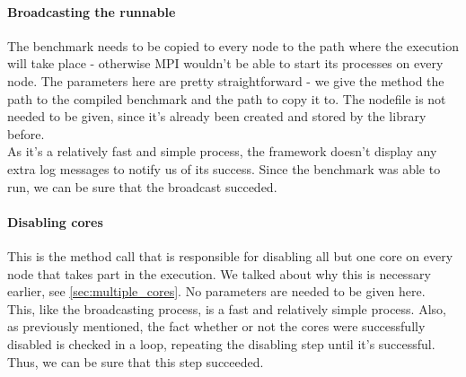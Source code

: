 \paragraph{Broadcasting the runnable}
The benchmark needs to be copied to every node to the path where the
execution will take place - otherwise MPI wouldn't be able to start
its processes on every node. The parameters here are pretty
straightforward - we give the method the path to the compiled
benchmark and the path to copy it to. The nodefile is not needed to be
given, since it's already been created and stored by the library
before.\\[0.3cm]
As it's a relatively fast and simple process, the framework doesn't
display any extra log messages to notify us of its success. Since
the benchmark was able to run, we can be sure that the broadcast
succeded.
\paragraph{Disabling cores}
This is the method call that is responsible for disabling all but one
core on every node that takes part in the execution. We talked about
why this is necessary earlier, see \ref{sec:multiple_cores}. No
parameters are needed to be given here.\\[0.3cm]
This, like the broadcasting process, is a fast and relatively simple
process. Also, as previously mentioned, the fact whether or not the
cores were successfully disabled is checked in a loop, repeating the
disabling step until it's successful. Thus, we can be sure that this
step succeeded.
